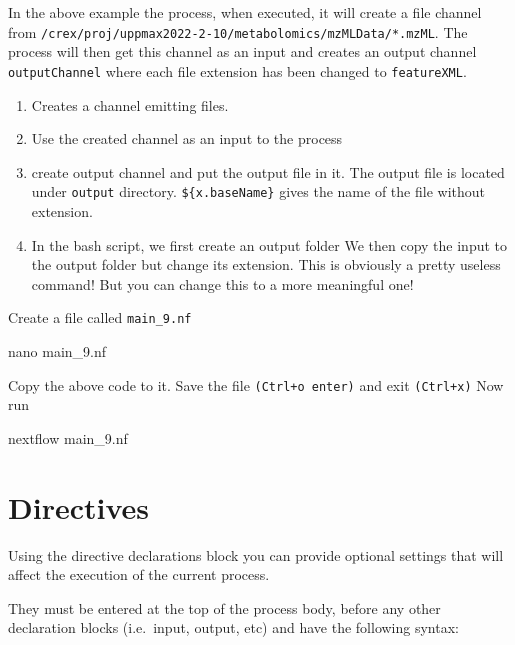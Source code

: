 \documentclass[
]{book}
\newenvironment{Shaded}{\begin{snugshade}}{\end{snugshade}}
\newcommand{\ExtensionTok}[1]{#1}
\newcommand{\FunctionTok}[1]{\textcolor[rgb]{0.00,0.00,0.00}{#1}}
\newcommand{\NormalTok}[1]{#1}
\providecommand{\tightlist}{%
  \setlength{\itemsep}{0pt}\setlength{\parskip}{0pt}}
\begin{document}
In the above example the process, when executed, it will create a file channel from \texttt{/crex/proj/uppmax2022-2-10/metabolomics/mzMLData/*.mzML}. The process will then get this channel as an input and creates an output channel \texttt{outputChannel} where each file extension has been changed to \texttt{featureXML}.

\begin{enumerate}
\def\labelenumi{\arabic{enumi}.}
\tightlist
\item
  Creates a channel emitting files.
\item
  Use the created channel as an input to the process
\item
  create output channel and put the output file in it. The output file is located under \texttt{output} directory. \texttt{\$\{x.baseName\}} gives the name of the file without extension.
\item
  In the bash script, we first create an output folder We then copy the input to the output folder but change its extension. This is obviously a pretty useless command! But you can change this to a more meaningful one!
\end{enumerate}

Create a file called \texttt{main\_9.nf}

\begin{Shaded}
\begin{Highlighting}[numbers=left,,]
\FunctionTok{nano}\NormalTok{ main\_9.nf}
\end{Highlighting}
\end{Shaded}

Copy the above code to it. Save the file \texttt{(Ctrl+o\ enter)} and exit \texttt{(Ctrl+x)}
Now run

\begin{Shaded}
\begin{Highlighting}[numbers=left,,]
\ExtensionTok{nextflow}\NormalTok{ main\_9.nf}
\end{Highlighting}
\end{Shaded}

\hypertarget{directives}{%
\section{Directives}\label{directives}}

Using the directive declarations block you can provide optional settings that will affect the execution of the current process.

They must be entered at the top of the process body, before any other declaration blocks (i.e.~input, output, etc) and have the following syntax:
\end{document}

